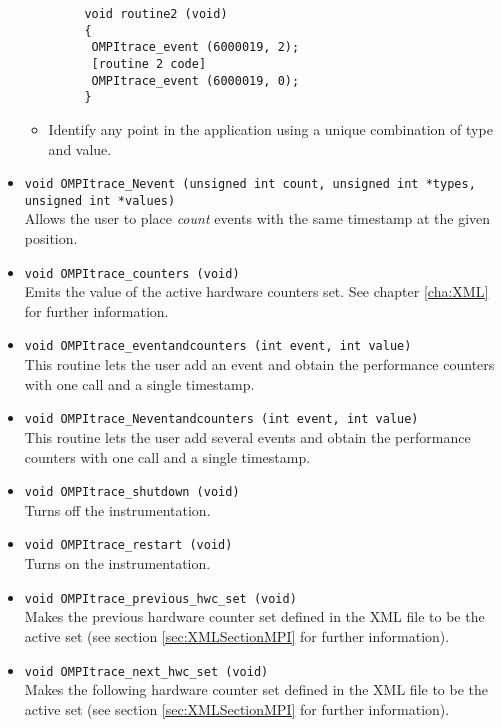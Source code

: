\begin{itemize}
\begin{itemize}
\begin{verbatim}
     void routine2 (void)
     {
      OMPItrace_event (6000019, 2);
      [routine 2 code]
      OMPItrace_event (6000019, 0);
     }
   \end{verbatim}
   \item Identify any point in the application using a unique combination of type and value.
  \end{itemize}

 \item {\tt void OMPItrace\_Nevent (unsigned int count, unsigned int *types, unsigned int *values)}\\
  Allows the user to place {\em count} events with the same timestamp at the given position.

 \item {\tt void OMPItrace\_counters (void)}\\
  Emits the value of the active hardware counters set. See chapter \ref{cha:XML} for further information.

 \item {\tt void OMPItrace\_eventandcounters (int event, int value)}\\
  This routine lets the user add an event and obtain the performance counters with one call and a single timestamp.

 \item {\tt void OMPItrace\_Neventandcounters (int event, int value)}\\
  This routine lets the user add several events and obtain the performance counters with one call and a single timestamp.

 \item {\tt void OMPItrace\_shutdown (void)}\\
  Turns off the instrumentation.

 \item {\tt void OMPItrace\_restart (void)}\\
  Turns on the instrumentation.

 \item {\tt void OMPItrace\_previous\_hwc\_set (void)}\\
  Makes the previous hardware counter set defined in the XML file to be the active set (see section \ref{sec:XMLSectionMPI} for further information).

 \item {\tt void OMPItrace\_next\_hwc\_set (void)}\\
  Makes the following hardware counter set defined in the XML file to be the active set (see section \ref{sec:XMLSectionMPI} for further information).


\end{itemize}
